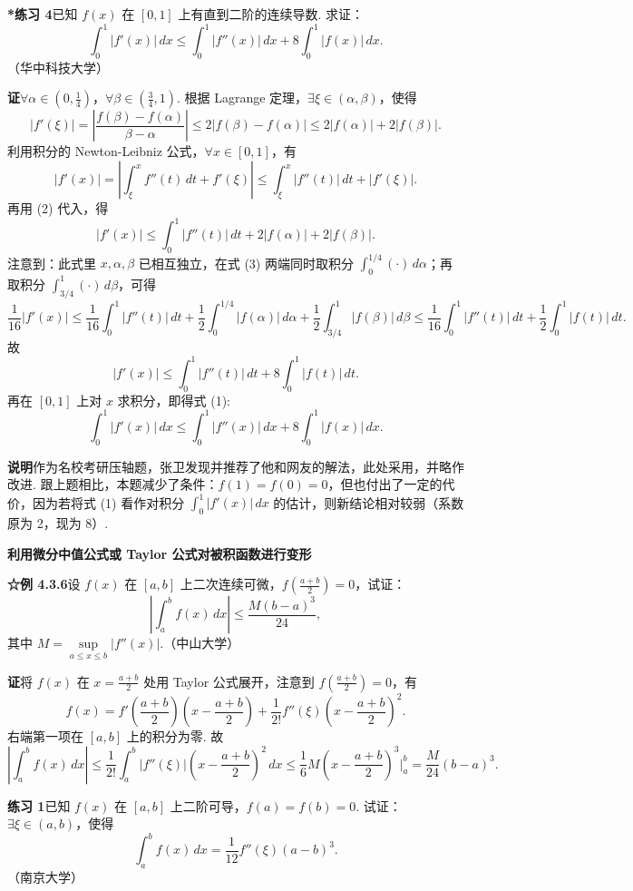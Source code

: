 \documentclass[UTF8, 12pt, fontset=fandol, oneside]{ctexart}
\begin{document}
\noindent\textbf{*练习 4}\quad 已知 $f(x)$ 在 $[0,1]$ 上有直到二阶的连续导数. 求证：
\[
\int_0^1|f'(x)|\,dx
\le\int_0^1|f''(x)|\,dx+8\int_0^1|f(x)|\,dx.
\tag{1}
\]
（华中科技大学）

\noindent\textbf{证}\quad $\forall\alpha\in(0,\frac14)$，$\forall\beta\in(\frac34,1)$. 根据 Lagrange 定理，$\exists\xi\in(\alpha,\beta)$，使得
\[
|f'(\xi)|
=\left|\frac{f(\beta)-f(\alpha)}{\beta-\alpha}\right|
\le2|f(\beta)-f(\alpha)|
\le2|f(\alpha)|+2|f(\beta)|.
\tag{2}
\]
利用积分的 Newton-Leibniz 公式，$\forall x\in[0,1]$，有
\[
|f'(x)|=\left|\int_\xi^x f''(t)\,dt+f'(\xi)\right|
\le\int_\xi^x|f''(t)|\,dt+|f'(\xi)|.
\]
再用 (2) 代入，得
\[
|f'(x)|\le\int_0^1|f''(t)|\,dt+2|f(\alpha)|+2|f(\beta)|.
\tag{3}
\]
注意到：此式里 $x,\alpha,\beta$ 已相互独立，在式 (3) 两端同时取积分 $\int_0^{1/4}(\cdot)\,d\alpha$；再取积分 $\int_{3/4}^1(\cdot)\,d\beta$，可得
\[
\frac1{16}|f'(x)|
\le\frac1{16}\int_0^1|f''(t)|\,dt
+\frac12\int_0^{1/4}|f(\alpha)|\,d\alpha
+\frac12\int_{3/4}^1|f(\beta)|\,d\beta
\le\frac1{16}\int_0^1|f''(t)|\,dt+\frac12\int_0^1|f(t)|\,dt.
\]
故
\[
|f'(x)|\le\int_0^1|f''(t)|\,dt+8\int_0^1|f(t)|\,dt.
\]
再在 $[0,1]$ 上对 $x$ 求积分，即得式 (1):
\[
\int_0^1|f'(x)|\,dx
\le\int_0^1|f''(x)|\,dx+8\int_0^1|f(x)|\,dx.
\]

\noindent\textbf{说明}\quad 作为名校考研压轴题，张卫发现并推荐了他和网友的解法，此处采用，并略作改进. 跟上题相比，本题减少了条件：$f(1)=f(0)=0$，但也付出了一定的代价，因为若将式 (1) 看作对积分 $\int_0^1|f'(x)|\,dx$ 的估计，则新结论相对较弱（系数原为 2，现为 8）.

\noindent\textbf{利用微分中值公式或 Taylor 公式对被积函数进行变形}

\noindent\textbf{☆例 4.3.6}\quad 设 $f(x)$ 在 $[a,b]$ 上二次连续可微，$f(\frac{a+b}{2})=0$，试证：
\[
\left|\int_a^b f(x)\,dx\right|\le\frac{M(b-a)^3}{24},
\]
其中 $M=\sup\limits_{a\le x\le b}|f''(x)|$.（中山大学）

\noindent\textbf{证}\quad 将 $f(x)$ 在 $x=\frac{a+b}{2}$ 处用 Taylor 公式展开，注意到 $f(\frac{a+b}{2})=0$，有
\[
f(x)=f'\left(\frac{a+b}{2}\right)\left(x-\frac{a+b}{2}\right)
+\frac1{2!}f''(\xi)\left(x-\frac{a+b}{2}\right)^2.
\]
右端第一项在 $[a,b]$ 上的积分为零. 故
\[
\left|\int_a^b f(x)\,dx\right|
\le\frac1{2!}\int_a^b|f''(\xi)|\left(x-\frac{a+b}{2}\right)^2\,dx
\le\frac16M\left(x-\frac{a+b}{2}\right)^3\bigg|_a^b
=\frac{M}{24}(b-a)^3.
\]

\noindent\textbf{练习 1}\quad 已知 $f(x)$ 在 $[a,b]$ 上二阶可导，$f(a)=f(b)=0$. 试证：$\exists\xi\in(a,b)$，使得
\[
\int_a^b f(x)\,dx=\frac1{12}f''(\xi)(a-b)^3.
\]
（南京大学）
\end{document}
